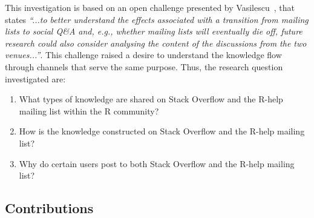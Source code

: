 \documentclass{sig-alternate-05-2015}
\begin{document}
	This investigation is based on an open challenge presented by Vasilescu~\cite{Vasilescu2014b}, that states \textit{``...to better understand the effects associated with a transition from mailing lists to social Q\&A and, e.g., whether mailing lists will eventually die off, future research could also consider analysing the content of the discussions from the two venues...''}.
	This challenge raised a desire to understand the knowledge flow through channels that serve the same purpose.
	Thus, the research question investigated are:

	\begin{enumerate}[\bfseries RQ-1.]
		\item What types of knowledge are shared on Stack Overflow and the R-help mailing list within the R community?
		\item How is the knowledge constructed on Stack Overflow and the R-help mailing list? 
		\item Why do certain users post to both Stack Overflow and the R-help mailing list?
	\end{enumerate}

\subsection{Contributions}
\end{document}
